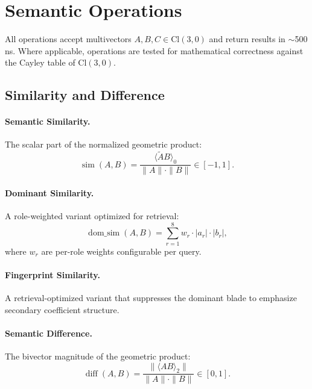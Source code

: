 \documentclass[11pt,a4paper]{article}
\newcommand{\Cl}{\mathrm{Cl}}
\newcommand{\grade}[1]{\langle #1 \rangle}
\newcommand{\rev}[1]{\widetilde{#1}}
\begin{document}
\section{Semantic Operations}
\label{sec:operations}

All operations accept multivectors $A, B, C \in \Cl(3,0)$ and return results
in $\sim$500\,ns. Where applicable, operations are tested for mathematical
correctness against the Cayley table of $\Cl(3,0)$.

\subsection{Similarity and Difference}

\paragraph{Semantic Similarity.} The scalar part of the normalized geometric
product:
\begin{equation}
  \operatorname{sim}(A, B) = \frac{\grade{\rev{A} B}_0}{\|A\| \cdot \|B\|} \in [-1, 1].
\end{equation}

\paragraph{Dominant Similarity.} A role-weighted variant optimized for retrieval:
\begin{equation}
  \operatorname{dom\_sim}(A, B) = \sum_{r=1}^{8} w_r \cdot |a_r| \cdot |b_r|,
\end{equation}
where $w_r$ are per-role weights configurable per query.

\paragraph{Fingerprint Similarity.} A retrieval-optimized variant that
suppresses the dominant blade to emphasize secondary coefficient structure.

\paragraph{Semantic Difference.} The bivector magnitude of the geometric product:
\begin{equation}
  \operatorname{diff}(A, B) = \frac{\|\grade{AB}_2\|}{\|A\|\cdot\|B\|} \in [0, 1].
\end{equation}
\end{document}
